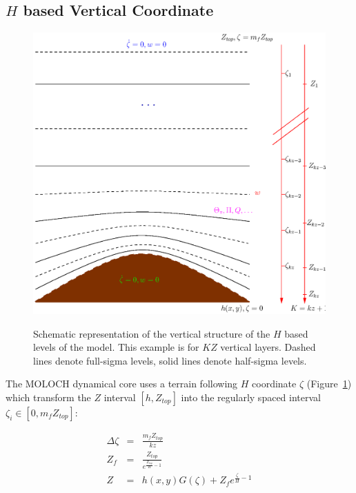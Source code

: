 \subsection{$H$ based Vertical Coordinate}
\label{h_coordinate}

\begin{figure}
\begin{center}
\resizebox{3.5in}{!}
{\includegraphics{moloch_levels.eps}}
\caption{Schematic representation of the vertical structure of the $H$
based levels of the model.
This example is for $KZ$ vertical layers. Dashed lines denote full-sigma levels,
solid lines denote half-sigma levels.}
\label{moloch_levels}
\end{center}
\end{figure}

The \ac{MOLOCH} dynamical core uses a terrain following $H$ coordinate
$\zeta$ (Figure~\ref{moloch_levels}) which transform the $Z$
interval $[h, Z_{top}]$ into the regularly spaced interval $\zeta_i
\in [0,m_f Z_{top}]$:

\begin{eqnarray}
  \Delta \zeta &=& \frac{m_f Z_{top}}{kz} \\
  Z_f &=& \frac{Z_{top}}{e^{\frac{Z_{top}}{H}-1}} \\
  Z &=& h(x,y) G(\zeta) + Z_f e^{\frac{\zeta}{H}-1}
\end{eqnarray}


